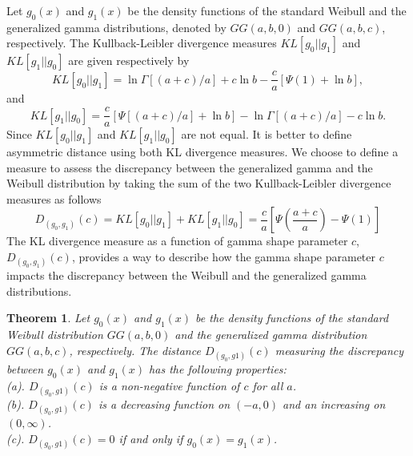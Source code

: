 \documentclass{ps}
\theoremstyle{plain}%
\newtheorem{theorem}{Theorem}[section]
\theoremstyle{definition}
\theoremstyle{remark}
\begin{document}
Let $g_0(x)$ and $g_1(x)$ be the density functions of the standard Weibull and the generalized gamma distributions, denoted by $GG(a,b,0)$ and  $GG(a, b, c)$, respectively. The Kullback-Leibler divergence measures $KL[g_0||g_1]$ and $KL[g_1||g_0]$ are given respectively by
\begin{equation}
	KL[g_0||g_1] = \ln \Gamma[(a+c)/a] + c\ln b - \frac{c}{a}[\Psi(1)+ \ln b],
\end{equation}
\noindent and
\begin{equation}
	KL[g_1||g_0] = \frac{c}{a}\left[\Psi[(a+c)/a] +\ln b\right] - \ln\Gamma[(a+c)/a] - c\ln b.
\end{equation}
Since $KL[g_0||g_1]$  and $KL[g_1||g_0]$  are not equal. It is better to define asymmetric distance using both KL divergence measures. We choose to define a measure to assess the discrepancy between the generalized gamma and the Weibull distribution by taking the sum of the two Kullback-Leibler divergence measures as follows
\begin{equation}
	D_{(g_0, g_1)}(c) = KL[g_0||g_1] + KL[g_1||g_0] = \frac{c}{a}\left[ \Psi\left(\frac{a+c}{a} \right) - \Psi(1)\right]
\end{equation}
The KL divergence measure as a function of gamma shape parameter $c$, $D_{(g_0, g_1)}(c)$,  provides a way to describe how the gamma shape parameter $c$ impacts the discrepancy between the Weibull and the generalized gamma distributions.
\begin{theorem}\label{thm5.2}
	Let $g_0(x)$ and $g_1(x)$ be the density functions of the standard Weibull distribution $GG(a, b, 0)$ and the generalized gamma distribution $GG(a, b, c)$, respectively. The distance $D_{(g_0, g1)}(c)$  measuring the discrepancy between  $g_0(x)$ and $g_1(x)$  has the following properties:\\
	(a).  $D_{(g_0, g1)}(c)$ is a non-negative function of $c$ for all $a$. \\
	(b).  $D_{(g_0, g1)}(c)$ is a decreasing function on $(-a, 0)$ and an increasing on $(0, \infty)$.\\
	(c).  $D_{(g_0, g1)}(c) = 0$ if and only if $g_0(x) = g_1(x)$.
\end{theorem}
\end{document}
